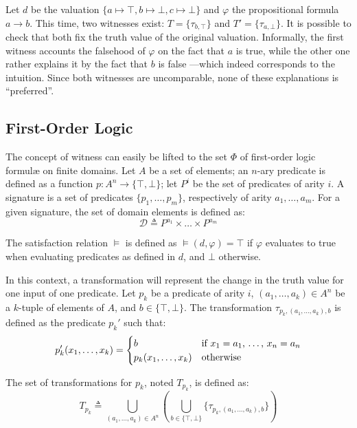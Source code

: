 \begin{example}
Let $d$ be the valuation $\{a \mapsto \top,b \mapsto \bot,c \mapsto\bot\}$ and $\varphi$ the propositional formula $a \rightarrow b$. This time, two witnesses exist: $T= \{\tau_{b,\top}\}$ and $T' = \{\tau_{a,\bot}\}$. It is possible to check that both fix the truth value of the original valuation. Informally, the first witness accounts the falsehood of $\varphi$ on the fact that $a$ is true, while the other one rather explains it by the fact that $b$ is false ---which indeed corresponds to the intuition. Since both witnesses are uncomparable, none of these explanations is ``preferred''.
\end{example}



\subsection{First-Order Logic}

The concept of witness can easily be lifted to the set $\Phi$ of first-order logic formul\ae{} on finite domains. Let $A$ be a set of elements; an $n$-ary predicate is defined as a function $p : A^n \rightarrow \{\top,\bot\}$; let $P^i$ be the set of predicates of arity $i$. A signature is a set of predicates $\{p_1, \dots, p_m\}$, respectively of arity $a_1, \dots, a_m$. For a given signature, the set of domain elements is defined as:
\[
\mathcal{D} \triangleq P^{a_1} \times \dots \times P^{a_m}
\]

The satisfaction relation $\models$ is defined as $\models(d, \varphi) = \top$ if $\varphi$ evaluates to true when evaluating predicates as defined in $d$, and $\bot$ otherwise.

In this context, a transformation will represent the change in the truth value for one input of one predicate. Let $p_k$ be a predicate of arity $i$, $(a_1, \dots, a_k) \in A^n$ be a $k$-tuple of elements of $A$, and $b \in \{\top,\bot\}$. The transformation $\tau_{p_k,(a_1,\dots,a_k),b}$ is defined as the predicate $p_k'$ such that:
\[
p_k'(x_1,\dots,x_k) = 
\begin{cases}
b & \mbox{if $x_1 = a_1$, \dots, $x_n = a_n$}\\
p_k(x_1,\dots,x_k) & \mbox{otherwise}
\end{cases}
\]

The set of transformations for $p_k$, noted $T_{p_k}$, is defined as:
\[
T_{p_k} \triangleq \bigcup_{(a_1,\dots,a_k)\in A^n} \left(\bigcup_{b \in \{\top,\bot\}} \{\tau_{p_k,(a_1,\dots,a_k),b}\}\right)
\]

